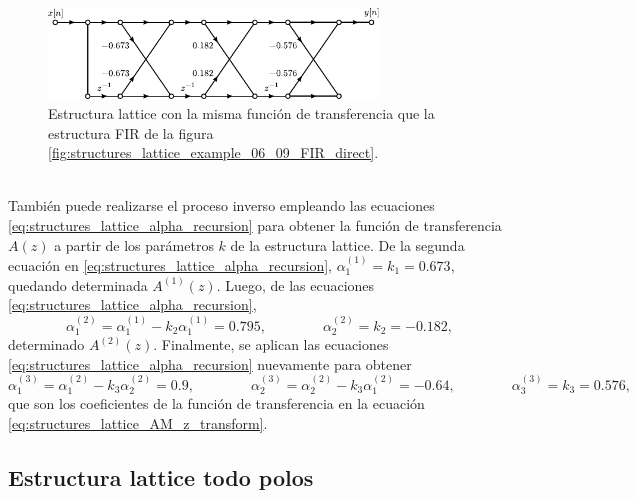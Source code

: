 \documentclass[a4paper]{report}
\begin{document}
\begin{figure}[!htb]
 \begin{center}
 \includegraphics[width=0.78\textwidth]{figuras/structures_lattice_example_06_09_lattice.pdf}
 \caption{\label{fig:structures_lattice_example_06_09_lattice} Estructura lattice con la misma función de transferencia que la estructura FIR de la figura \ref{fig:structures_lattice_example_06_09_FIR_direct}.}
 \end{center}
\end{figure}
\\
También puede realizarse el proceso inverso empleando las ecuaciones \ref{eq:structures_lattice_alpha_recursion} para obtener la función de transferencia \(A(z)\) a partir de los parámetros \(k\) de la estructura lattice. De la segunda ecuación en \ref{eq:structures_lattice_alpha_recursion}, \(\alpha^{(1)}_1=k_1=0.673\), quedando determinada \(A^{(1)}(z)\). Luego, de las ecuaciones \ref{eq:structures_lattice_alpha_recursion},
\[
 \alpha^{(2)}_1=\alpha^{(1)}_1-k_2\alpha^{(1)}_{1}=0.795,
 \qquad\qquad 
 \alpha^{(2)}_2=k_2=-0.182,
\]
determinado \(A^{(2)}(z)\). Finalmente, se aplican las ecuaciones \ref{eq:structures_lattice_alpha_recursion} nuevamente para obtener
\[
 \alpha^{(3)}_1=\alpha^{(2)}_1-k_3\alpha^{(2)}_{2}=0.9,
 \qquad\qquad
 \alpha^{(3)}_2=\alpha^{(2)}_2-k_3\alpha^{(2)}_{1}=-0.64,
 \qquad\qquad 
 \alpha^{(3)}_3=k_3=0.576,
\] 
que son los coeficientes de la función de transferencia en la ecuación \ref{eq:structures_lattice_AM_z_transform}.

\subsection{Estructura lattice todo polos}
\end{document}
